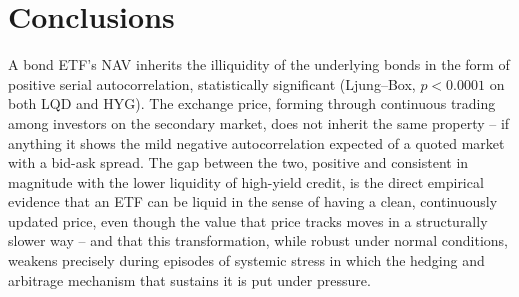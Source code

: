 \documentclass[11pt]{article}
\begin{document}
\section{Conclusions}
\label{sec:conclusions}

A bond ETF's NAV inherits the illiquidity of the underlying bonds in the form of positive serial autocorrelation, statistically significant (Ljung--Box, $p<0.0001$ on both LQD and HYG). The exchange price, forming through continuous trading among investors on the secondary market, does not inherit the same property -- if anything it shows the mild negative autocorrelation expected of a quoted market with a bid-ask spread. The gap between the two, positive and consistent in magnitude with the lower liquidity of high-yield credit, is the direct empirical evidence that an ETF can be liquid in the sense of having a clean, continuously updated price, even though the value that price tracks moves in a structurally slower way -- and that this transformation, while robust under normal conditions, weakens precisely during episodes of systemic stress in which the hedging and arbitrage mechanism that sustains it is put under pressure.
\end{document}
